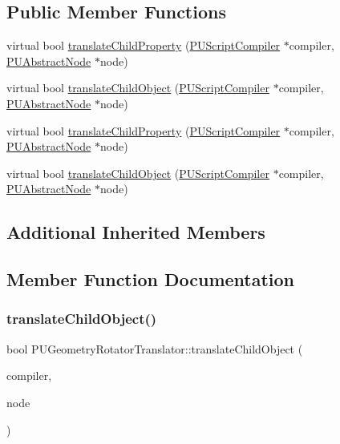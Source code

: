 \subsection*{Public Member Functions}
\begin{DoxyCompactItemize}
\item 
virtual bool \hyperlink{classPUGeometryRotatorTranslator_addd250f61f2d96200792f2ce33ecc0ae}{translate\+Child\+Property} (\hyperlink{classPUScriptCompiler}{P\+U\+Script\+Compiler} $\ast$compiler, \hyperlink{classPUAbstractNode}{P\+U\+Abstract\+Node} $\ast$node)
\item 
virtual bool \hyperlink{classPUGeometryRotatorTranslator_a541e3dd7d0fd4abe023e00b21c27e189}{translate\+Child\+Object} (\hyperlink{classPUScriptCompiler}{P\+U\+Script\+Compiler} $\ast$compiler, \hyperlink{classPUAbstractNode}{P\+U\+Abstract\+Node} $\ast$node)
\item 
virtual bool \hyperlink{classPUGeometryRotatorTranslator_a4da3898f78298bd083ab77f829a59340}{translate\+Child\+Property} (\hyperlink{classPUScriptCompiler}{P\+U\+Script\+Compiler} $\ast$compiler, \hyperlink{classPUAbstractNode}{P\+U\+Abstract\+Node} $\ast$node)
\item 
virtual bool \hyperlink{classPUGeometryRotatorTranslator_a3ee5b48b1941941f77320f90ac8cd562}{translate\+Child\+Object} (\hyperlink{classPUScriptCompiler}{P\+U\+Script\+Compiler} $\ast$compiler, \hyperlink{classPUAbstractNode}{P\+U\+Abstract\+Node} $\ast$node)
\end{DoxyCompactItemize}
\subsection*{Additional Inherited Members}


\subsection{Member Function Documentation}
\mbox{\label{classPUGeometryRotatorTranslator_a541e3dd7d0fd4abe023e00b21c27e189}} 
\subsubsection{\texorpdfstring{translate\+Child\+Object()}{translateChildObject()}\hspace{0.1cm}{\footnotesize\ttfamily [1/2]}}
{\footnotesize\ttfamily bool P\+U\+Geometry\+Rotator\+Translator\+::translate\+Child\+Object (\begin{DoxyParamCaption}\item[{\hyperlink{classPUScriptCompiler}{P\+U\+Script\+Compiler} $\ast$}]{compiler,  }\item[{\hyperlink{classPUAbstractNode}{P\+U\+Abstract\+Node} $\ast$}]{node }\end{DoxyParamCaption})\hspace{0.3cm}{\ttfamily [virtual]}}

